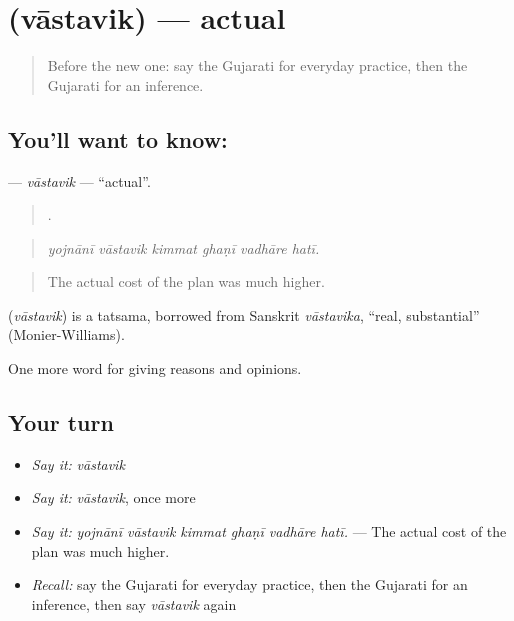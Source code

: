 \section[\texorpdfstring{\gu{વાસ્તવિક} (vāstavik)}{વાસ્તવિક (vāstavik)}]{ (vāstavik) — actual}

\label{lesson:GU-C365-vastavik}



\begin{quote}
Before the new one: say the Gujarati for everyday practice, then the Gujarati for an inference.
\end{quote}

\subsection*{You'll want to know: }
\textbf{} — \emph{vāstavik} — \textquotedblleft{}actual\textquotedblright{}.

\begin{quote}
     .
\end{quote}

\begin{quote}
\emph{yojnānī vāstavik kimmat ghaṇī vadhāre hatī.}
\end{quote}

\begin{quote}
The actual cost of the plan was much higher.
\end{quote}

\begin{cousinweb}
\textbf{} (\emph{vāstavik}) is a tatsama, borrowed from Sanskrit \emph{vāstavika}, \textquotedblleft{}real, substantial\textquotedblright{} (Monier-Williams).
\end{cousinweb}

\begin{grammarlens}[title={What you've built}]
One more word for giving reasons and opinions.
\end{grammarlens}

\subsection*{Your turn}
\begin{itemize}
\raggedright
  \item \emph{Say it:} \emph{vāstavik}
  \item \emph{Say it:} \emph{vāstavik}, once more
  \item \emph{Say it:} \emph{yojnānī vāstavik kimmat ghaṇī vadhāre hatī.} — The actual cost of the plan was much higher.
  \item \emph{Recall:} say the Gujarati for everyday practice, then the Gujarati for an inference, then say \emph{vāstavik} again
\end{itemize}

